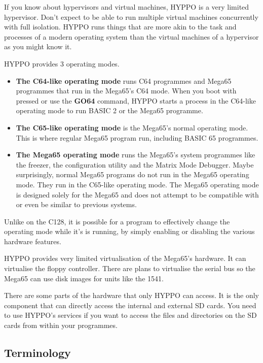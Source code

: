 If you know about hypervisors and virtual machines, HYPPO is a very limited
hypervisor. Don't expect to be able to run multiple virtual machines
concurrently with full isolation. HYPPO runs things that are more akin to the
task and processes of a modern operating system than the virtual machines of a
hypervisor as you might know it.

HYPPO provides 3 operating modes.

\begin{itemize}
  \item \textbf{The C64-like operating mode} runs C64 programmes and Mega65
        programmes that run in the Mega65's C64 mode. When you boot with
        \megasymbolkey pressed or use the \textbf{GO64} command, HYPPO
        starts a process in the C64-like operating mode to run BASIC 2 or the
        Mega65 programme.
  \item \textbf{The C65-like operating mode} is the Mega65's normal operating
        mode. This is where regular Mega65 program run, including BASIC 65
        programmes.
  \item \textbf{The Mega65 operating mode} runs the Mega65's system programmes
        like the freezer, the configuration utility and the Matrix Mode
        Debugger. Maybe surprisingly, normal Mega65 programs do not run in the
        Mega65 operating mode. They run in the C65-like operating mode. The
        Mega65 operating mode is designed solely for the Mega65 and does not
        attempt to be compatible with or even be similar to previous systems.
\end{itemize}

Unlike on the C128, it is possible for a program to effectively change the
operating mode while it's is running, by simply enabling or disabling the
various hardware features.

\filbreak
HYPPO provides very limited virtualisation of the Mega65's hardware. It can
virtualise the floppy controller. There are plans to virtualise the serial bus
so the Mega65 can use disk images for units like the 1541.

There are some parts of the hardware that only HYPPO can access. It is the only
component that can directly access the internal and external SD cards. You need
to use HYPPO's services if you want to access the files and directories on the
SD cards from within your programmes.

\subsection{Terminology}


